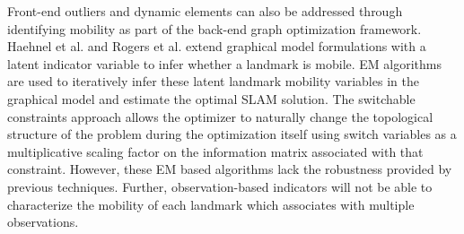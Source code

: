 
Front-end outliers and dynamic elements can also be addressed through identifying mobility as part of the back-end graph
optimization framework.  Haehnel et al. \cite{haehnel03iros} and Rogers et al. \cite{rogers2010slam} extend graphical model formulations with a latent indicator variable to infer whether a landmark is mobile. EM algorithms are used to iteratively infer these
latent landmark mobility variables in the graphical model and estimate the optimal SLAM solution.%
The switchable
constraints \cite{Switchable12} approach allows the optimizer to naturally
change the topological structure of the problem during the optimization itself
using switch variables as a multiplicative scaling factor on the information
matrix associated with that constraint. However, these EM based algorithms lack
the robustness provided by previous techniques.    Further, observation-based
indicators will not be able to characterize the mobility of each landmark which
associates with multiple observations.
